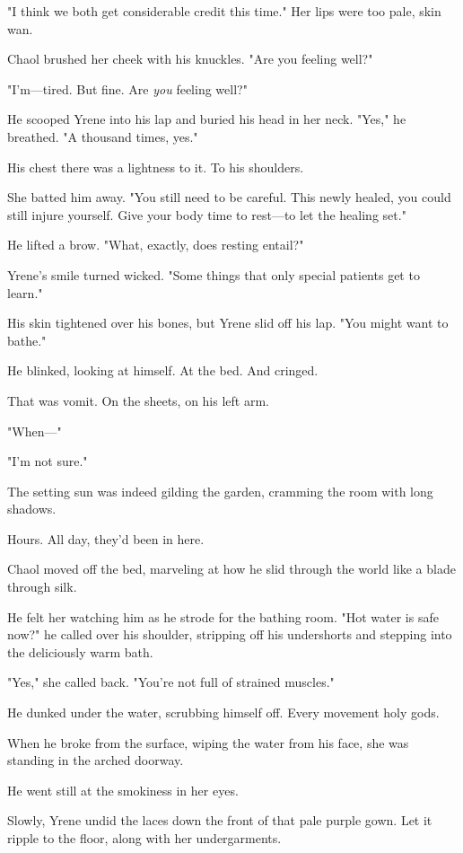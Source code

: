 "I think we both get considerable credit this time." Her lips were too pale, skin wan.

Chaol brushed her cheek with his knuckles. "Are you feeling well?"

"I'm---tired. But fine. Are \emph{you} feeling well?"

He scooped Yrene into his lap and buried his head in her neck. "Yes," he breathed. "A thousand times, yes."

His chest  there was a lightness to it. To his shoulders.

She batted him away. "You still need to be careful. This newly healed, you could still injure yourself. Give your body time to rest---to let the healing set."

He lifted a brow. "What, exactly, does resting entail?"

Yrene's smile turned wicked. "Some things that only special patients get to learn."

His skin tightened over his bones, but Yrene slid off his lap. "You might want to bathe."

He blinked, looking at himself. At the bed. And cringed.

That was vomit. On the sheets, on his left arm.

"When---"

"I'm not sure."

The setting sun was indeed gilding the garden, cramming the room with long shadows.

Hours. All day, they'd been in here.

Chaol moved off the bed, marveling at how he slid through the world like a blade through silk.

He felt her watching him as he strode for the bathing room. "Hot water is safe now?" he called over his shoulder, stripping off his undershorts and stepping into the deliciously warm bath.

"Yes," she called back. "You're not full of strained muscles."

He dunked under the water, scrubbing himself off. Every movement
 holy gods.

When he broke from the surface, wiping the water from his face, she was standing in the arched doorway.

He went still at the smokiness in her eyes.

Slowly, Yrene undid the laces down the front of that pale purple gown. Let it ripple to the floor, along with her undergarments.


